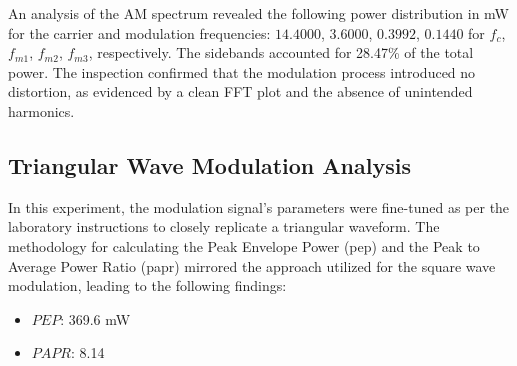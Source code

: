 \documentclass[a4paper, twocolumn]{article}
\begin{document}
        An analysis of the AM spectrum revealed the following power distribution in mW for the carrier and modulation frequencies: $14.4000$, $3.6000$, $0.3992$, $0.1440$ for $f_c$, $f_{m1}$, $f_{m2}$, $f_{m3}$, respectively. The sidebands accounted for 28.47\% of the total power. The inspection confirmed that the modulation process introduced no distortion, as evidenced by a clean FFT plot and the absence of unintended harmonics.

        
        \subsection*{Triangular Wave Modulation Analysis}
        In this experiment, the modulation signal's parameters were fine-tuned as per the laboratory instructions to closely replicate a triangular waveform. The methodology for calculating the Peak Envelope Power (\gls{pep}) and the Peak to Average Power Ratio (\gls{papr}) mirrored the approach utilized for the square wave modulation, leading to the following findings:
        
        \begin{itemize}
            \item $PEP$: 369.6 mW
            \item $PAPR$: 8.14
        \end{itemize}
\end{document}
